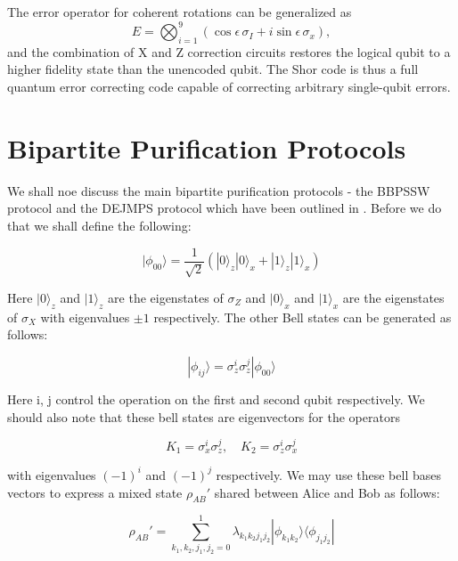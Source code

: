 \documentclass[conference]{IEEEtran}
\begin{document}
The error operator for coherent rotations can be generalized as
\begin{equation}
E = \bigotimes_{i=1}^{9} (\cos \epsilon\, \sigma_I + i \sin \epsilon\, \sigma_x),
\end{equation}
and the combination of X and Z correction circuits restores the logical qubit to a higher fidelity state than the unencoded qubit. The Shor code is thus a full quantum error correcting code capable of correcting arbitrary single-qubit errors.



\section{Bipartite Purification Protocols}
We shall noe discuss the main bipartite purification protocols - the BBPSSW protocol and the DEJMPS protocol which have been outlined in \cite{paper2}. Before we do that we shall define the following:

\begin{equation}
    | \phi_{00} \rangle = \frac{1}{\sqrt{2}} (|0\rangle_z |0\rangle_x + |1\rangle_z |1\rangle_x)
\end{equation}

Here $|0\rangle_z$ and $|1\rangle_z$ are the eigenstates of $\sigma_Z$ and $|0\rangle_x$ and $|1\rangle_x$ are the eigenstates of $\sigma_X$ with eigenvalues $\pm 1$ respectively. The other Bell states can be generated as follows:

\begin{equation}
    | \phi_{ij} \rangle = \sigma_z^i \sigma_z^j | \phi_{00} \rangle
\end{equation}

Here i, j control the operation on the first and second qubit respectively. We should also note that these bell states are eigenvectors for the operators

\begin{equation}
    K_1 = \sigma_x^i \sigma_z^j, \quad K_2 = \sigma_z^i \sigma_x^j
\end{equation}

with eigenvalues $(-1)^i$ and $(-1)^j$ respectively. We may use these bell bases vectors to express a mixed state $\rho_{AB}'$ shared between Alice and Bob as follows:

\begin{equation}
    \rho_{AB}' = \sum_{k_1, k_2, j_1, j_2 = 0}^{1} \lambda_{k_1 k_2 j_1 j_2} | \phi_{k_1 k_2} \rangle \langle \phi_{j_1 j_2} |
\end{equation}
\end{document}
